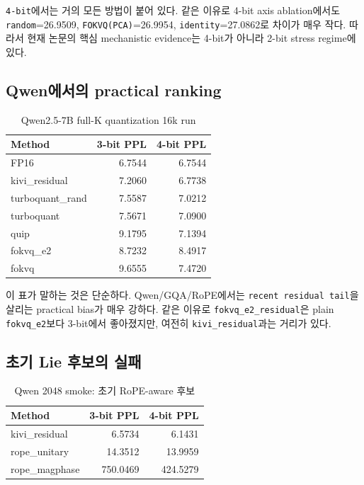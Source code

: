 \documentclass[11pt,a4paper]{article}
\begin{document}
\texttt{4-bit}에서는 거의 모든 방법이 붙어 있다. 같은 이유로 4-bit axis ablation에서도 \texttt{random}=26.9509, \texttt{FOKVQ(PCA)}=26.9954, \texttt{identity}=27.0862로 차이가 매우 작다. 따라서 현재 논문의 핵심 mechanistic evidence는 4-bit가 아니라 2-bit stress regime에 있다.

\subsection{Qwen에서의 practical ranking}

\begin{table}[H]
\centering
\caption{Qwen2.5-7B full-K quantization 16k run}
\small
\begin{tabular}{lrr}
\toprule
\textbf{Method} & \textbf{3-bit PPL} & \textbf{4-bit PPL} \\
\midrule
FP16 & 6.7544 & 6.7544 \\
kivi\_residual & 7.2060 & 6.7738 \\
turboquant\_rand & 7.5587 & 7.0212 \\
turboquant & 7.5671 & 7.0900 \\
quip & 9.1795 & 7.1394 \\
fokvq\_e2 & 8.7232 & 8.4917 \\
fokvq & 9.6555 & 7.4720 \\
\bottomrule
\end{tabular}
\end{table}

이 표가 말하는 것은 단순하다. Qwen/GQA/RoPE에서는 \texttt{recent residual tail}을 살리는 practical bias가 매우 강하다. 같은 이유로 \texttt{fokvq\_e2\_residual}은 plain \texttt{fokvq\_e2}보다 3-bit에서 좋아졌지만, 여전히 \texttt{kivi\_residual}과는 거리가 있다.

\subsection{초기 Lie 후보의 실패}

\begin{table}[H]
\centering
\caption{Qwen 2048 smoke: 초기 RoPE-aware 후보}
\small
\begin{tabular}{lrr}
\toprule
\textbf{Method} & \textbf{3-bit PPL} & \textbf{4-bit PPL} \\
\midrule
kivi\_residual & 6.5734 & 6.1431 \\
rope\_unitary & 14.3512 & 13.9959 \\
rope\_magphase & 750.0469 & 424.5279 \\
\bottomrule
\end{tabular}
\end{table}
\end{document}
